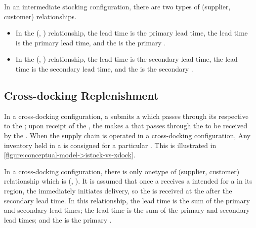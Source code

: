In an intermediate stocking configuration,
there are two types of (supplier, customer) relationships.
\begin{itemize}
\item
In the (, ) relationship,
the  lead time is the primary  lead time,
the  lead time is the primary  lead time,
and the  is the primary .
\item
In the (, ) relationship,
the  lead time is the secondary  lead time,
the  lead time is the secondary  lead time,
and the  is the secondary .
\end{itemize}





\subsection{Cross-docking Replenishment}
\label{subsection:conceptual-model->inventory-replenishment->xdock}

In a cross-docking configuration,
a  submits a 
which passes through its respective 
to the ;
upon receipt of the ,
the  makes a 
that passes through the 
to be received by the .
When the supply chain is operated in a cross-docking configuration,
Any inventory held in a  is consigned
for a particular .
This is illustrated in
\autoref{figure:conceptual-model->istock-vs-xdock}.

In a cross-docking configuration,
there is only onetype of (supplier, customer) relationship
which is (, ).
It is assumed that once a 
receives a  intended for
a  in its region,
the  immediately initiates delivery,
so the  is received at the 
after the secondary  lead time.
In this relationship,
the  lead time is
the sum of the primary and secondary  lead times;
the  lead time is
the sum of the primary and secondary  lead times;
and the  is
the primary .





